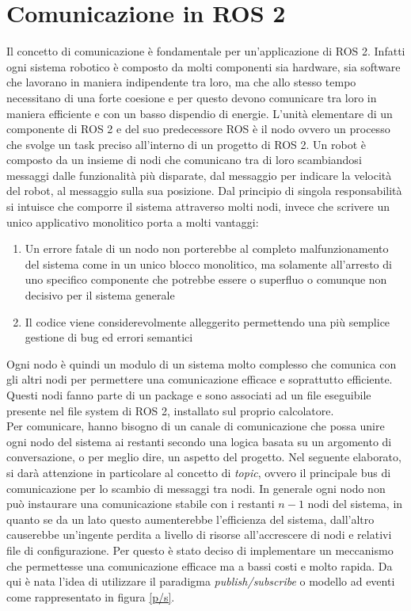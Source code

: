 \documentclass[a4paper,11 pt,oneside]{book}
\theoremstyle{definition}
\begin{document}
\section{Comunicazione in ROS 2}
Il concetto di comunicazione è fondamentale per un'applicazione di ROS 2. Infatti ogni sistema robotico è composto da molti componenti sia hardware, sia software che lavorano in maniera indipendente tra loro, ma che allo stesso tempo necessitano di una forte coesione e per questo devono comunicare tra loro in maniera efficiente e con un basso dispendio di energie. L'unità elementare di un componente di ROS 2 e del suo predecessore ROS è il nodo ovvero
un processo che svolge un task preciso all'interno di un progetto di ROS 2. Un robot è composto da un insieme di nodi che comunicano tra di loro scambiandosi messaggi dalle funzionalità più disparate, dal messaggio per indicare la velocità del robot, al messaggio sulla sua posizione.
Dal principio di singola responsabilità si intuisce che comporre il sistema attraverso molti nodi, invece che scrivere un unico applicativo monolitico porta a molti vantaggi:
\begin{enumerate}
\item Un errore fatale di un nodo non porterebbe al completo malfunzionamento del sistema come in un unico blocco monolitico, ma solamente all'arresto di uno specifico componente che potrebbe essere o superfluo o comunque non decisivo per il sistema generale
\item Il codice viene considerevolmente alleggerito permettendo una più semplice gestione di bug ed errori semantici
\end{enumerate}
Ogni nodo è quindi un modulo di un sistema molto complesso che comunica con gli altri nodi per permettere una comunicazione efficace e soprattutto efficiente. Questi nodi fanno parte di un package e sono associati ad un file eseguibile presente nel file system di ROS 2, installato sul proprio calcolatore. 
\\
Per comunicare, hanno bisogno di un canale di comunicazione che possa unire ogni nodo del sistema ai restanti secondo una logica basata su un argomento di conversazione, o per meglio dire, un aspetto del progetto. Nel seguente elaborato, si darà  attenzione in particolare al concetto di \emph{topic}, ovvero il principale bus di comunicazione per lo scambio di messaggi tra nodi.
In generale ogni nodo non può instaurare una comunicazione stabile con i restanti $n-1$ nodi del sistema, in quanto se da un lato questo aumenterebbe l'efficienza del sistema, dall'altro causerebbe un'ingente perdita a livello di risorse all'accrescere di nodi e relativi file di configurazione. Per questo è stato deciso di implementare un meccanismo che permettesse una comunicazione efficace ma a bassi costi e molto rapida. Da qui è nata l'idea di utilizzare il paradigma \emph{publish/subscribe} o modello ad eventi come rappresentato in figura \ref{p/s}.
\end{document}
